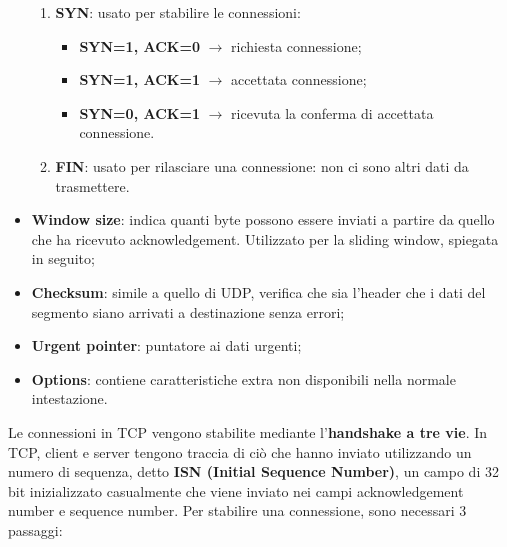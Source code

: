 \documentclass{article}
\begin{document}
\begin{itemize}
\begin{enumerate}
                    \item \textbf{SYN}: usato per stabilire le connessioni:
                        \begin{itemize}
                            \item \textbf{SYN=1, ACK=0} $\rightarrow$ richiesta connessione;
                            \item \textbf{SYN=1, ACK=1} $\rightarrow$ accettata connessione;
                            \item \textbf{SYN=0, ACK=1} $\rightarrow$ ricevuta la conferma di accettata connessione.
                        \end{itemize}
                    \item \textbf{FIN}: usato per rilasciare una connessione: non ci sono altri dati da trasmettere.
                \end{enumerate}
            \item \textbf{Window size}: indica quanti byte possono essere inviati a partire da quello che ha
            ricevuto acknowledgement. Utilizzato per la sliding window, spiegata in seguito;
            \item \textbf{Checksum}: simile a quello di UDP, verifica che sia l’header che i dati del segmento siano
            arrivati a destinazione senza errori;
            \item \textbf{Urgent pointer}: puntatore ai dati urgenti;
            \item \textbf{Options}: contiene caratteristiche extra non disponibili nella normale intestazione.
                
        \end{itemize}
        Le connessioni in TCP vengono stabilite mediante l’\textbf{handshake a tre vie}. In TCP, client e server
        tengono traccia di ciò che hanno inviato utilizzando un numero di sequenza, detto \textbf{ISN (Initial
        Sequence Number)}, un campo di 32 bit inizializzato casualmente che viene inviato nei campi
        acknowledgement number e sequence number.
        Per stabilire una connessione, sono necessari 3 passaggi:
\end{document}
